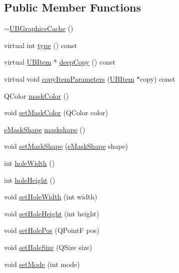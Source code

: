 \subsection*{Public Member Functions}
\begin{DoxyCompactItemize}
\item 
\hyperlink{class_u_b_graphics_cache_a548ad3388753e636ec29db3a05fc43a9}{$\sim$\-U\-B\-Graphics\-Cache} ()
\item 
virtual int \hyperlink{class_u_b_graphics_cache_adf6146b2d4680edeee501e93e30f58e0}{type} () const 
\item 
virtual \hyperlink{class_u_b_item}{U\-B\-Item} $\ast$ \hyperlink{class_u_b_graphics_cache_ad69d3f9eb75cea2bfe292a26e481395c}{deep\-Copy} () const 
\item 
virtual void \hyperlink{class_u_b_graphics_cache_a1ed78b934144d8cceaa274f6ff2c82cf}{copy\-Item\-Parameters} (\hyperlink{class_u_b_item}{U\-B\-Item} $\ast$copy) const 
\item 
Q\-Color \hyperlink{class_u_b_graphics_cache_a37847ef6d96093a76c130fb18d80f06c}{mask\-Color} ()
\item 
void \hyperlink{class_u_b_graphics_cache_a9d7f126906a562015d9c49a13e7344ae}{set\-Mask\-Color} (Q\-Color color)
\item 
\hyperlink{_u_b_graphics_cache_8h_ac59628c0f9ed257ff9874210c6ad3232}{e\-Mask\-Shape} \hyperlink{class_u_b_graphics_cache_a88b2e2b2a70b36e9d1f438da25971e43}{maskshape} ()
\item 
void \hyperlink{class_u_b_graphics_cache_a8f55e3605e79ddc129f06f7053adfcd2}{set\-Mask\-Shape} (\hyperlink{_u_b_graphics_cache_8h_ac59628c0f9ed257ff9874210c6ad3232}{e\-Mask\-Shape} shape)
\item 
int \hyperlink{class_u_b_graphics_cache_a656d5d7f1d022eb28d8c6e18771f55f9}{hole\-Width} ()
\item 
int \hyperlink{class_u_b_graphics_cache_a3f94b8be025492106c989e0894d52573}{hole\-Height} ()
\item 
void \hyperlink{class_u_b_graphics_cache_a6090256dd3e539d00f3a07a63fd1a4c0}{set\-Hole\-Width} (int width)
\item 
void \hyperlink{class_u_b_graphics_cache_a48cb7de5d02867189ac0f0e78fc2a1f9}{set\-Hole\-Height} (int height)
\item 
void \hyperlink{class_u_b_graphics_cache_ab52d5e77a5f14200b5d9559aee283427}{set\-Hole\-Pos} (Q\-Point\-F pos)
\item 
void \hyperlink{class_u_b_graphics_cache_a31d7adeb4495e251dba2338c457418da}{set\-Hole\-Size} (Q\-Size size)
\item 
void \hyperlink{class_u_b_graphics_cache_a6f0086c7036226f7218e7c754ffe39af}{set\-Mode} (int mode)
\end{DoxyCompactItemize}
